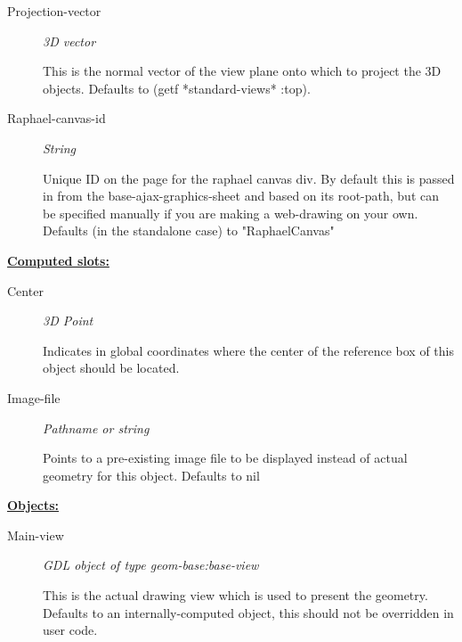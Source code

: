 \documentclass [11pt]{book}
\begin{document}
\begin{itemize}
\begin{description}
\item [Projection-vector]
\emph{3D vector}

 This is the normal vector of the view plane onto which to project the 3D objects. Defaults to (getf *standard-views* :top).




\item [Raphael-canvas-id]
\emph{String}

 Unique ID on the page for the raphael canvas div. By default this is passed in
from the base-ajax-graphics-sheet and based on its root-path, but can be specified manually
if you are making a web-drawing on your own. Defaults (in the standalone case) to "RaphaelCanvas"




\end{description}






\textbf{
\underline{Computed slots:}}

\begin{description}

\item [Center]
\emph{3D Point}

 Indicates in global coordinates where the center of the reference
box of this object should be located.




\item [Image-file]
\emph{Pathname or string}

 Points to a pre-existing image file to be displayed instead of actual geometry for this object. Defaults to nil




\end{description}






\textbf{
\underline{Objects:}}

\begin{description}

\item [Main-view]
\emph{GDL object of type geom-base:base-view}

 This is the actual drawing view which is used to present the geometry. Defaults to an
internally-computed object, this should not be overridden in user code.




\end{description}







\end{itemize}
\end{document}
